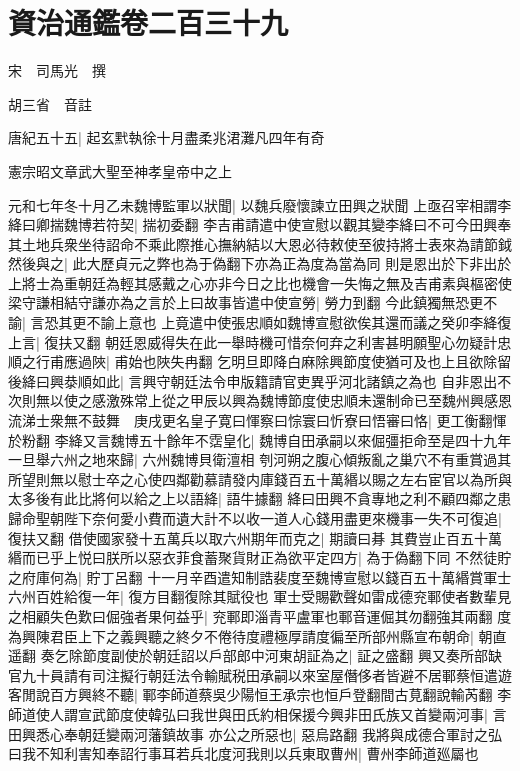 \chapter{資治通鑑卷二百三十九}
宋　司馬光　撰

胡三省　音註

唐紀五十五|{
	起玄黓執徐十月盡柔兆涒灘凡四年有奇}


憲宗昭文章武大聖至神孝皇帝中之上

元和七年冬十月乙未魏博監軍以狀聞|{
	以魏兵廢懷諫立田興之狀聞}
上亟召宰相謂李絳曰卿揣魏博若符契|{
	揣初委翻}
李吉甫請遣中使宣慰以觀其變李絳曰不可今田興奉其土地兵衆坐待詔命不乘此際推心撫納結以大恩必待敕使至彼持將士表來為請節鉞然後與之|{
	此大歷貞元之弊也為于偽翻下亦為正為度為當為同}
則是恩出於下非出於上將士為重朝廷為輕其感戴之心亦非今日之比也機會一失悔之無及吉甫素與樞密使梁守謙相結守謙亦為之言於上曰故事皆遣中使宣勞|{
	勞力到翻}
今此鎮獨無恐更不諭|{
	言恐其更不諭上意也}
上竟遣中使張忠順如魏博宣慰欲俟其還而議之癸卯李絳復上言|{
	復扶又翻}
朝廷恩威得失在此一舉時機可惜奈何弃之利害甚明願聖心勿疑計忠順之行甫應過陜|{
	甫始也陜失冉翻}
乞明旦即降白麻除興節度使猶可及也上且欲除留後絳曰興㳟順如此|{
	言興守朝廷法令申版籍請官吏異乎河北諸鎮之為也}
自非恩出不次則無以使之感激殊常上從之甲辰以興為魏博節度使忠順未還制命已至魏州興感恩流涕士衆無不鼓舞　庚戌更名皇子寛曰惲察曰悰寰曰忻寮曰悟審曰恪|{
	更工衡翻惲於粉翻}
李絳又言魏博五十餘年不霑皇化|{
	魏博自田承嗣以來倔彊拒命至是四十九年}
一旦舉六州之地來歸|{
	六州魏博貝衛澶相}
刳河朔之腹心傾叛亂之巢穴不有重賞過其所望則無以慰士卒之心使四鄰勸慕請發内庫錢百五十萬緡以賜之左右宦官以為所與太多後有此比將何以給之上以語絳|{
	語牛據翻}
絳曰田興不貪專地之利不顧四鄰之患歸命聖朝陛下奈何愛小費而遺大計不以收一道人心錢用盡更來機事一失不可復追|{
	復扶又翻}
借使國家發十五萬兵以取六州期年而克之|{
	期讀曰朞}
其費豈止百五十萬緡而已乎上悦曰朕所以惡衣菲食蓄聚貨財正為欲平定四方|{
	為于偽翻下同}
不然徒貯之府庫何為|{
	貯丁呂翻}
十一月辛酉遣知制誥裴度至魏博宣慰以錢百五十萬緡賞軍士六州百姓給復一年|{
	復方目翻復除其賦役也}
軍士受賜歡聲如雷成德兖鄆使者數輩見之相顧失色歎曰倔強者果何益乎|{
	兖鄆即淄青平盧軍也鄆音運倔其勿翻強其兩翻}
度為興陳君臣上下之義興聽之終夕不倦待度禮極厚請度徧至所部州縣宣布朝命|{
	朝直遥翻}
奏乞除節度副使於朝廷詔以戶部郎中河東胡証為之|{
	証之盛翻}
興又奏所部缺官九十員請有司注擬行朝廷法令輸賦税田承嗣以來室屋僭侈者皆避不居鄆蔡恒遣遊客閒說百方興終不聽|{
	鄆李師道蔡吳少陽恒王承宗也恒戶登翻間古莧翻說輸芮翻}
李師道使人謂宣武節度使韓弘曰我世與田氏約相保援今興非田氏族又首變兩河事|{
	言田興悉心奉朝廷變兩河藩鎮故事}
亦公之所惡也|{
	惡烏路翻}
我將與成德合軍討之弘曰我不知利害知奉詔行事耳若兵北度河我則以兵東取曹州|{
	曹州李師道廵屬也}
